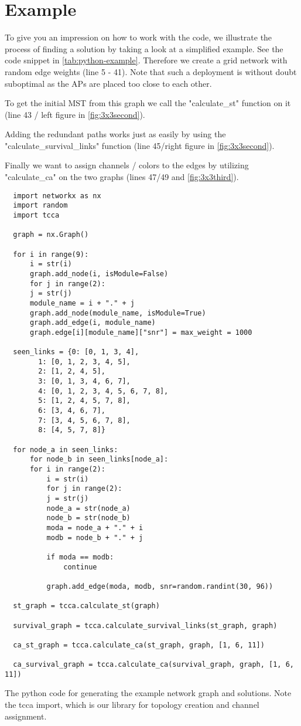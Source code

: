   \section{Example}
    To give you an impression on how to work with the code, we illustrate the process of finding a solution by taking a look at a simplified example.
    See the code snippet in \ref{tab:python-example}.
    Therefore we create a grid network with random edge weights (line 5 - 41).
    Note that such a deployment is without doubt suboptimal as the APs are placed too close to each other.

    To get the initial \ac{MST} from this graph we call the "calculate\_st" function on it (line 43 / left figure in \ref{fig:3x3second}).
    
    Adding the redundant paths works just as easily by using the "calculate\_survival\_links" function (line 45/right figure in \ref{fig:3x3second}).
    
    Finally we want to assign channels / colors to the edges by utilizing "calculate\_ca" on the two graphs (lines 47/49 and \ref{fig:3x3third}).
    
    \newpage
    
    \begin{table}[h!]
    \lstset{language=Python}
    \begin{lstlisting}
  import networkx as nx
  import random
  import tcca

  graph = nx.Graph()

  for i in range(9):
      i = str(i)
      graph.add_node(i, isModule=False)
      for j in range(2):
	  j = str(j)
	  module_name = i + "." + j
	  graph.add_node(module_name, isModule=True)
	  graph.add_edge(i, module_name)
	  graph.edge[i][module_name]["snr"] = max_weight = 1000

  seen_links = {0: [0, 1, 3, 4], 
		1: [0, 1, 2, 3, 4, 5], 
		2: [1, 2, 4, 5], 
		3: [0, 1, 3, 4, 6, 7], 
		4: [0, 1, 2, 3, 4, 5, 6, 7, 8], 
		5: [1, 2, 4, 5, 7, 8], 
		6: [3, 4, 6, 7], 
		7: [3, 4, 5, 6, 7, 8], 
		8: [4, 5, 7, 8]}

  for node_a in seen_links:
      for node_b in seen_links[node_a]:
	  for i in range(2):
	      i = str(i)
	      for j in range(2):
		  j = str(j)
		  node_a = str(node_a)
		  node_b = str(node_b)
		  moda = node_a + "." + i
		  modb = node_b + "." + j

		  if moda == modb:
		      continue

		  graph.add_edge(moda, modb, snr=random.randint(30, 96))

  st_graph = tcca.calculate_st(graph)

  survival_graph = tcca.calculate_survival_links(st_graph, graph)

  ca_st_graph = tcca.calculate_ca(st_graph, graph, [1, 6, 11])

  ca_survival_graph = tcca.calculate_ca(survival_graph, graph, [1, 6, 11])
    \end{lstlisting}
    \caption{The python code for generating the example network graph and solutions. 
      Note the tcca import, which is our library for topology creation and channel assignment.}
    \label{tab:python-example}
  \end{table}
  
